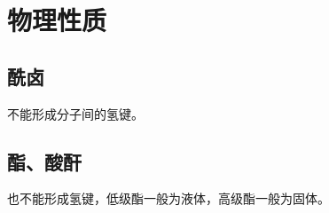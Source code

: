 \section{物理性质}


\subsection{酰卤}

\begin{center}
\end{center}

不能形成分子间的氢键。

\subsection{酯、酸酐}

\begin{center}
\end{center}

\begin{center}
\end{center}

也不能形成氢键，低级酯一般为液体，高级酯一般为固体。